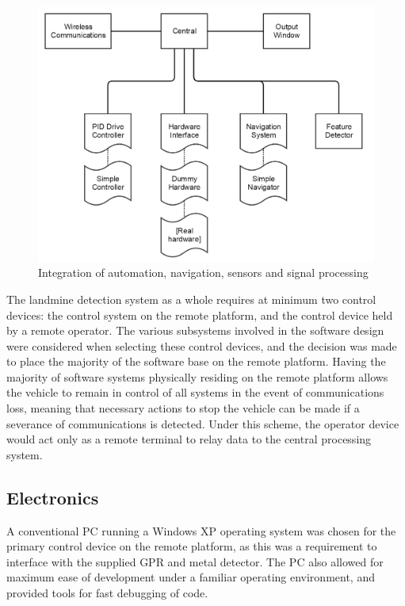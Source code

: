 \documentclass[main.tex]{subfiles}
\begin{document}
\begin{figure}[ht]
\includegraphics[width=\textwidth]{3-ConceptDesign/fyp_structure.png}
\centering
\caption{Integration of automation, navigation, sensors and signal processing} 
\end{figure}

The landmine detection system as a whole requires at minimum two control devices: the control system on the remote platform, and the control device held by a remote operator. The various subsystems involved in the software design were considered when selecting these control devices, and the decision was made to place the majority of the software base on the remote platform. Having the majority of software systems physically residing on the remote platform allows the vehicle to remain in control of all systems in the event of communications loss, meaning that necessary actions to stop the vehicle can be made if a severance of communications is detected. Under this scheme, the operator device would act only as a remote terminal to relay data to the central processing system.

\subsection{Electronics}
A conventional PC running a Windows XP operating system was chosen for the primary control device on the remote platform, as this was a requirement to interface with the supplied GPR and metal detector. The PC also allowed for maximum ease of development under a familiar operating environment, and provided tools for fast debugging of code.
\end{document}
